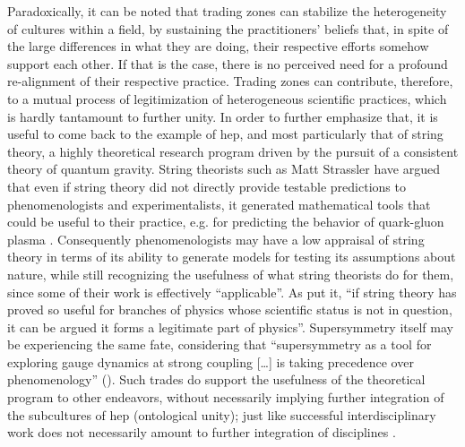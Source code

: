 \documentclass[smallextended]{svjour3}
\begin{document}
Paradoxically, it can be noted that trading zones can stabilize the heterogeneity of cultures within a field, by sustaining the practitioners' beliefs that, in spite of the large differences in what they are doing, their respective efforts somehow support each other. If that is the case, there is no perceived need for a profound re-alignment of their respective practice. Trading zones can contribute, therefore, to a mutual process of legitimization of heterogeneous scientific practices, which is hardly tantamount to further unity. In order to further emphasize that, it is useful to come back to the example of \gls{hep}, and most particularly that of string theory, a highly theoretical research program driven by the pursuit of a consistent theory of quantum gravity. String theorists such as Matt Strassler have argued that even if string theory did not directly provide testable predictions to phenomenologists and experimentalists, it generated mathematical tools that could be useful to their practice, e.g. for predicting the behavior of quark-gluon plasma \citep{Ritson2021}. Consequently phenomenologists may have a low appraisal of string theory in terms of its ability to generate models for testing its assumptions about nature, while still recognizing the usefulness of what string theorists do for them, since some of their work is effectively ``applicable''. As \citet{Ritson2015} put it, ``if string theory has proved so useful for branches of physics whose scientific status is not in question, it can be argued it forms a legitimate part of physics''. Supersymmetry itself may be experiencing the same fate, considering that ``supersymmetry as a tool for exploring gauge dynamics at strong coupling [\dots] is taking precedence over phenomenology'' (\citealt[p.~7--8]{Shifman2020}). %
Such trades do support the usefulness of the theoretical program to other endeavors, without necessarily implying further integration of the subcultures of \gls{hep} (ontological unity); just like successful interdisciplinary work does not necessarily amount to further integration of disciplines \citep{GrneYanoff2016}. 
\end{document}
